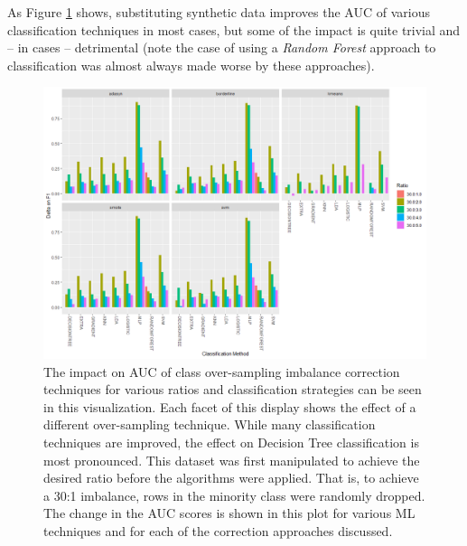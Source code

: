 \documentclass[letterpaper]{article}
\begin{document}
{As Figure \ref{fig:imbalance} shows, substituting synthetic data improves the AUC of various classification techniques in most cases, but some of the impact is quite trivial and -- in cases -- detrimental (note the case of using a \textit{Random Forest} approach to classification was almost always made worse by these approaches). 
%
%
%
%
%
%
\begin{figure}[H]
	\centering
	\includegraphics[width=0.9\linewidth]{./figures/imbalance.png}
	\caption[Class imbalance correction techniques]{The impact on AUC of class over-sampling imbalance correction techniques for various ratios and classification strategies can be seen in this visualization. Each facet of this display shows the effect of a different over-sampling technique. While many classification techniques are improved, the effect on Decision Tree classification is most pronounced. This dataset was first manipulated to achieve the desired ratio before the algorithms were applied. That is, to achieve a 30:1 imbalance, rows in the minority class were randomly dropped. The change in the AUC scores is shown in this plot for various ML techniques and for each of the correction approaches discussed.}
	\label{fig:imbalance}
\end{figure}

}
\end{document}
